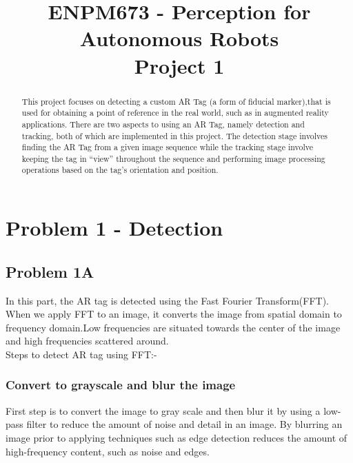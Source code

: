 \documentclass[conference]{IEEEtran}
\begin{document}
\title{ENPM673 - Perception for Autonomous Robots\\Project 1}

\author{
}


\maketitle

\begin{abstract}
This project focuses on detecting a custom AR Tag (a form of fiducial marker),that is used for obtaining a point of reference in the real world, such as in augmented reality applications. There are two aspects to using an AR Tag, namely detection and tracking, both of which are implemented in this project. The detection stage involves finding the AR Tag from a given image sequence while the tracking stage involve keeping the tag in “view” throughout the sequence and performing image processing operations based on the tag’s orientation and position.
\end{abstract}

\IEEEpeerreviewmaketitle



\section{Problem 1 - Detection}
\subsection{Problem 1A}
In this part, the AR tag is detected using the Fast Fourier Transform(FFT). When we apply FFT to an image, it converts the image from spatial domain to frequency domain.Low frequencies are situated towards the center of the image and high frequencies scattered around.\\
Steps to detect AR tag using FFT:-
\subsubsection{Convert to grayscale and blur the image}
First step is to convert the image to gray scale and then blur it by using a low-pass filter to reduce the amount of noise and detail in an image. By blurring an image prior to applying techniques such as edge detection reduces the amount of high-frequency content, such as noise and edges.
\end{document}
